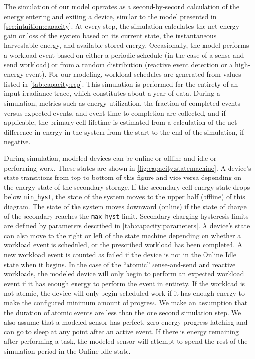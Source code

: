 The simulation of our model operates as a second-by-second calculation of the
energy entering and exiting a device, similar to the model presented in \cref{sec:intuition:capacity}.
At every step, the simulation calculates the net energy gain or loss of the
system based on its current state, the instantaneous harvestable energy, and available stored energy.  
Occasionally,
the model performs a workload event based on either a periodic schedule (in the
case of a sense-and-send workload) or from a random distribution (reactive
event detection or a high-energy event). For our modeling, workload schedules
are generated from values listed in \cref{tab:capacity:rep}.
This simulation is performed for the entirety of an
input irradiance trace, which constitutes about a year of data. During
a simulation, metrics such as energy utilization, the fraction of completed
events versus expected events, and event time to completion are collected,
and if applicable, the primary-cell lifetime is estimated from a 
calculation of the net difference in energy in the system from the start to the end of the simulation, if negative. 


During simulation, modeled devices can be online or offline and idle or performing
work. These states are shown in \cref{fig:capacity:statemachine}.  A device's state
transitions from top to bottom of this figure and vice versa depending on the
energy state of the secondary storage.
If the secondary-cell energy state drops below \texttt{min\_hyst},
the state of the system moves to the upper
half (\textsf{offline}) of this diagram. The state of the system moves downward (\textsf{online})
if the state of charge of the secondary reaches the \texttt{max\_hyst}
limit. 
Secondary charging hysteresis limits are defined by parameters described in \cref{tab:capacity:parameters}.
A device's state can also move
to the right or left of the state machine depending on whether a workload event
is scheduled, or the prescribed workload has been completed. A new
workload event is counted as failed if the device is not in the \textsf{Online
Idle} state when it begins.
In the case of the ``atomic''
sense-and-send and reactive workloads, the modeled device will only begin
to perform an expected workload event if it has
enough energy to perform the event in entirety. If the workload is not atomic,
the device will only begin scheduled work if it has enough energy to make the
configured minimum amount of progress. We
make an assumption that the duration of atomic events are less than the one
second simulation step.
We also assume that a modeled sensor has perfect, zero-energy progress
latching and can go to sleep at any point after an active event. 
If there is energy remaining after performing a task, the modeled sensor will
attempt to spend the rest of the simulation period in the \textsf{Online Idle} state.

